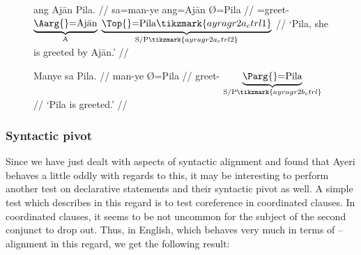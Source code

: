 \begin{figure}
\pex\label{ex:ayragr2}
\a\label{ex:ayragr2_1}\ljudge\ques%
\begingl[aboveglcskip=1.5em, aboveglftskip=1.75em]
	 {ang Ajān} Pila. //
	\glb sa=man-ye {ang=Ajān} {Ø=Pila} //
	\glc \PatT{}=greet-\TsgF{}
		$\underbrace{\text{\Aarg{}=\smash{Ajān}}}_{\text{A}}$
		$\underbrace{\text{\Top{}=Pila}\tikzmark{ayragr2a_ctrl1}}_%
			{\text{S/P}\tikzmark{ayragr2a_ctrl2}}$ //
	\glft `Pila, she is greeted by Ajān.' //
\endgl
{}

\a\label{ex:ayragr2_2}\begingl[aboveglftskip=1.75em]
	\gla Manye {sa Pila}. //
	\glb man-ye Ø=Pila //
	\glc greet-\TsgF{}
		$\underbrace{\text{\Parg{}=Pila}}_%
			{\text{S/P}\tikzmark{ayragr2b_ctrl}}$ //
	\glft `Pila is greeted.' //
\endgl
{}

\xe
\end{figure}

\subsubsection{Syntactic pivot}
\label{subsubsec:pivot}

Since we have just dealt with aspects of syntactic alignment and found that
Ayeri behaves a little oddly with regards to this, it may be interesting to
perform another test on declarative statements and their syntactic pivot as
well. A simple test which \citet[111--114]{comrie1989} describes in this regard
is to test coreference in coordinated clauses. In coordinated clauses, it seems
to be not uncommon for the subject of the second conjunct to drop out. Thus, in
English, which behaves very much in terms of \Nom{}--\Acc{} alignment in this
regard, we get the following result:

